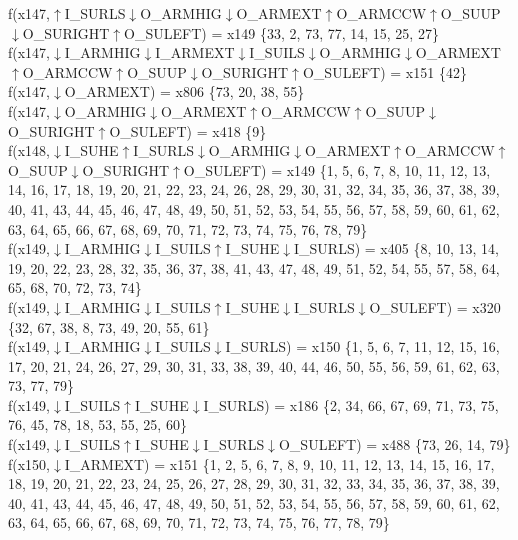 f(x147,$\uparrow$I\_SURLS$\downarrow$O\_ARMHIG$\downarrow$O\_ARMEXT$\uparrow$O\_ARMCCW$\uparrow$O\_SUUP$\downarrow$O\_SURIGHT$\uparrow$O\_SULEFT) = x149 \{33, 2, 73, 77, 14, 15, 25, 27\} \\  
f(x147,$\downarrow$I\_ARMHIG$\downarrow$I\_ARMEXT$\downarrow$I\_SUILS$\downarrow$O\_ARMHIG$\downarrow$O\_ARMEXT$\uparrow$O\_ARMCCW$\uparrow$O\_SUUP$\downarrow$O\_SURIGHT$\uparrow$O\_SULEFT) = x151 \{42\} \\  
f(x147,$\downarrow$O\_ARMEXT) = x806 \{73, 20, 38, 55\} \\  
f(x147,$\downarrow$O\_ARMHIG$\downarrow$O\_ARMEXT$\uparrow$O\_ARMCCW$\uparrow$O\_SUUP$\downarrow$O\_SURIGHT$\uparrow$O\_SULEFT) = x418 \{9\} \\  
f(x148,$\downarrow$I\_SUHE$\uparrow$I\_SURLS$\downarrow$O\_ARMHIG$\downarrow$O\_ARMEXT$\uparrow$O\_ARMCCW$\uparrow$O\_SUUP$\downarrow$O\_SURIGHT$\uparrow$O\_SULEFT) = x149 \{1, 5, 6, 7, 8, 10, 11, 12, 13, 14, 16, 17, 18, 19, 20, 21, 22, 23, 24, 26, 28, 29, 30, 31, 32, 34, 35, 36, 37, 38, 39, 40, 41, 43, 44, 45, 46, 47, 48, 49, 50, 51, 52, 53, 54, 55, 56, 57, 58, 59, 60, 61, 62, 63, 64, 65, 66, 67, 68, 69, 70, 71, 72, 73, 74, 75, 76, 78, 79\} \\  
f(x149,$\downarrow$I\_ARMHIG$\downarrow$I\_SUILS$\uparrow$I\_SUHE$\downarrow$I\_SURLS) = x405 \{8, 10, 13, 14, 19, 20, 22, 23, 28, 32, 35, 36, 37, 38, 41, 43, 47, 48, 49, 51, 52, 54, 55, 57, 58, 64, 65, 68, 70, 72, 73, 74\} \\  
f(x149,$\downarrow$I\_ARMHIG$\downarrow$I\_SUILS$\uparrow$I\_SUHE$\downarrow$I\_SURLS$\downarrow$O\_SULEFT) = x320 \{32, 67, 38, 8, 73, 49, 20, 55, 61\} \\  
f(x149,$\downarrow$I\_ARMHIG$\downarrow$I\_SUILS$\downarrow$I\_SURLS) = x150 \{1, 5, 6, 7, 11, 12, 15, 16, 17, 20, 21, 24, 26, 27, 29, 30, 31, 33, 38, 39, 40, 44, 46, 50, 55, 56, 59, 61, 62, 63, 73, 77, 79\} \\  
f(x149,$\downarrow$I\_SUILS$\uparrow$I\_SUHE$\downarrow$I\_SURLS) = x186 \{2, 34, 66, 67, 69, 71, 73, 75, 76, 45, 78, 18, 53, 55, 25, 60\} \\  
f(x149,$\downarrow$I\_SUILS$\uparrow$I\_SUHE$\downarrow$I\_SURLS$\downarrow$O\_SULEFT) = x488 \{73, 26, 14, 79\} \\  
f(x150,$\downarrow$I\_ARMEXT) = x151 \{1, 2, 5, 6, 7, 8, 9, 10, 11, 12, 13, 14, 15, 16, 17, 18, 19, 20, 21, 22, 23, 24, 25, 26, 27, 28, 29, 30, 31, 32, 33, 34, 35, 36, 37, 38, 39, 40, 41, 43, 44, 45, 46, 47, 48, 49, 50, 51, 52, 53, 54, 55, 56, 57, 58, 59, 60, 61, 62, 63, 64, 65, 66, 67, 68, 69, 70, 71, 72, 73, 74, 75, 76, 77, 78, 79\} \\  
